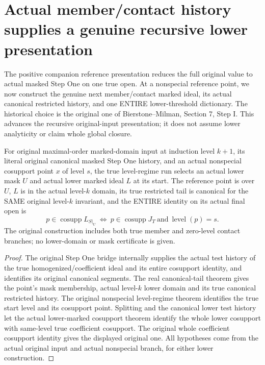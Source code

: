 \section{Actual member/contact history supplies a genuine recursive lower presentation}

The positive companion reference presentation reduces the full original value
to actual masked Step One on one true open. At a nonspecial reference point,
we now construct the genuine next member/contact marked ideal, its actual
canonical restricted history, and one ENTIRE lower-threshold dictionary.
The historical choice is the original one of Bierstone--Milman\cite{bierstone-milman08-functoriality},
Section 7, Step I. This advances the recursive original-input presentation;
it does not assume lower analyticity or claim whole global closure.

\begin{lemma}
\label{hir:original-frozen-recursive-lower-domain-whole-cosupport}
\leanok
{}
For original maximal-order marked-domain input at induction level $k+1$,
its literal original canonical masked Step One history, and an actual
nonspecial cosupport point $x$ of level $s$, the true level-regime run
selects an actual lower mask $U$ and actual lower marked ideal $L$ at its
start. The reference point is over $U$, $L$ is in the actual level-$k$
domain, its true restricted tail is canonical for the SAME original
level-$k$ invariant, and the ENTIRE identity on its actual final open is
\[
 p\in\operatorname{cosupp}L_{S|_U}
 \ \Longleftrightarrow\ p\in\operatorname{cosupp}J_T
                      \ \text{and}\ \operatorname{level}(p)=s.
\]
The original construction includes both true member and zero-level
contact branches; no lower-domain or mask certificate is given.
\end{lemma}
\begin{proof}
The original Step One bridge internally supplies the actual test history
of the true homogenized/coefficient ideal and its entire cosupport
identity, and identifies its original canonical segments. The real
canonical-tail theorem gives the point's mask membership, actual
level-$k$ lower domain and its true canonical restricted history.
The original nonspecial level-regime theorem identifies the true start
level and its cosupport point. Splitting and the canonical lower test
history let the actual lower-marked cosupport theorem identify the whole
lower cosupport with same-level true coefficient cosupport. The original
whole coefficient cosupport identity gives the displayed original one.
All hypotheses come from the actual original input and actual nonspecial
branch, for either lower construction.
\end{proof}

